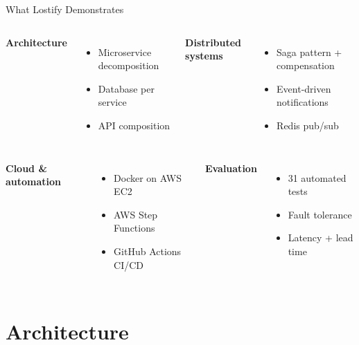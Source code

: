 \documentclass[11pt,aspectratio=169]{beamer}
\begin{document}
\begin{frame}{What Lostify Demonstrates}
  \begin{columns}[T]
    \textbf{Architecture}
    \begin{itemize}
      \item Microservice decomposition
      \item Database per service
      \item API composition
    \end{itemize}
    \textbf{Distributed systems}
    \begin{itemize}
      \item Saga pattern + compensation
      \item Event-driven notifications
      \item Redis pub/sub
    \end{itemize}
  \end{columns}
  \vspace{0.4cm}
  \begin{columns}[T]
    \textbf{Cloud \& automation}
    \begin{itemize}
      \item Docker on AWS EC2
      \item AWS Step Functions
      \item GitHub Actions CI/CD
    \end{itemize}
    \textbf{Evaluation}
    \begin{itemize}
      \item 31 automated tests
      \item Fault tolerance
      \item Latency + lead time
    \end{itemize}
  \end{columns}
\end{frame}

\section{Architecture}
\end{document}
